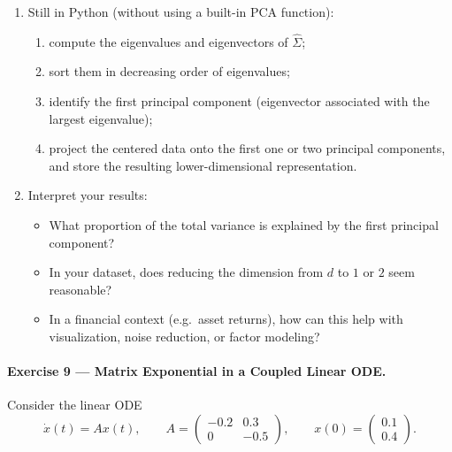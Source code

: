 \documentclass[11pt]{article}
\begin{document}
\begin{enumerate}
    \item Still in Python (without using a built-in PCA function):
    \begin{enumerate}
        \item compute the eigenvalues and eigenvectors of $\widehat{\Sigma}$;
        \item sort them in decreasing order of eigenvalues;
        \item identify the first principal component (eigenvector associated with the largest eigenvalue);
        \item project the centered data onto the first one or two principal components, and store the resulting lower-dimensional representation.
    \end{enumerate}
    
    \item Interpret your results:
    \begin{itemize}
        \item What proportion of the total variance is explained by the first principal component?
        \item In your dataset, does reducing the dimension from $d$ to $1$ or $2$ seem reasonable?
        \item In a financial context (e.g.\ asset returns), how can this help with visualization, noise reduction, or factor modeling?
    \end{itemize}
\end{enumerate}


\paragraph{Exercise 9 — Matrix Exponential in a Coupled Linear ODE.}

Consider the linear ODE
\[
\dot{x}(t) = A x(t), 
\qquad
A = \begin{pmatrix}
-0.2 & 0.3 \\
0    & -0.5
\end{pmatrix},
\qquad
x(0) = \begin{pmatrix} 0.1 \\ 0.4 \end{pmatrix}.
\]
\end{document}
